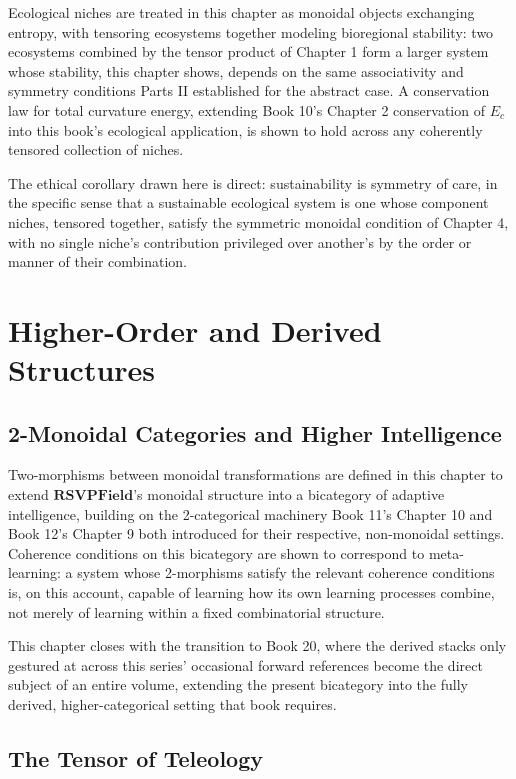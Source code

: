 Ecological niches are treated in this chapter as monoidal objects exchanging entropy, with tensoring ecosystems together modeling bioregional stability: two ecosystems combined by the tensor product of Chapter 1 form a larger system whose stability, this chapter shows, depends on the same associativity and symmetry conditions Parts II established for the abstract case. A conservation law for total curvature energy, extending Book 10's Chapter 2 conservation of $E_c$ into this book's ecological application, is shown to hold across any coherently tensored collection of niches.

The ethical corollary drawn here is direct: sustainability is symmetry of care, in the specific sense that a sustainable ecological system is one whose component niches, tensored together, satisfy the symmetric monoidal condition of Chapter 4, with no single niche's contribution privileged over another's by the order or manner of their combination.

\part{Higher-Order and Derived Structures}

\chapter{2-Monoidal Categories and Higher Intelligence}

Two-morphisms between monoidal transformations are defined in this chapter to extend $\mathbf{RSVPField}$'s monoidal structure into a bicategory of adaptive intelligence, building on the 2-categorical machinery Book 11's Chapter 10 and Book 12's Chapter 9 both introduced for their respective, non-monoidal settings. Coherence conditions on this bicategory are shown to correspond to meta-learning: a system whose 2-morphisms satisfy the relevant coherence conditions is, on this account, capable of learning how its own learning processes combine, not merely of learning within a fixed combinatorial structure.

This chapter closes with the transition to Book 20, where the derived stacks only gestured at across this series' occasional forward references become the direct subject of an entire volume, extending the present bicategory into the fully derived, higher-categorical setting that book requires.

\chapter{The Tensor of Teleology}

